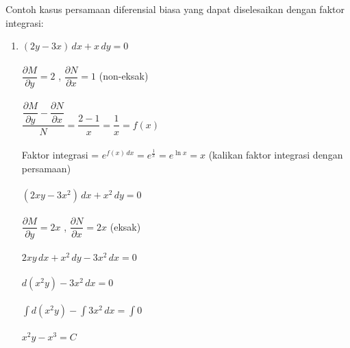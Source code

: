 Contoh kasus persamaan diferensial biasa yang dapat diselesaikan dengan faktor integrasi:

\begin{enumerate}[1.]

	\item \begin{math} (2y - 3x) \, dx + x \, dy = 0 \end{math} \\ \\ 
	\begin{math} \dfrac{\partial M}{\partial y} = 2 \end{math} , \begin{math} \dfrac{\partial N}{\partial x} = 1 \end{math} (non-eksak) \\ \\ 
	\begin{math} \dfrac{\dfrac{\partial M}{\partial y} - \dfrac{\partial N}{\partial x}}{N} = \dfrac{2 - 1}{x} = \dfrac{1}{x} = f(x) \end{math} \\ \\
	Faktor integrasi = \begin{math} e^{f(x) \, dx} = e^{\frac{1}{x}} = e ^{\ln x} = x \end{math} (kalikan faktor integrasi dengan persamaan) \\ \\ 
	\begin{math} (2xy - 3x^{2}) \, dx + x^{2} \, dy = 0 \end{math} \\ \\
	\begin{math} \dfrac{\partial M}{\partial y} = 2x \end{math} , \begin{math} \dfrac{\partial N}{\partial x} = 2x \end{math} (eksak) \\ \\ 
	\begin{math} 2xy \, dx + x^{2} \, dy - 3x^{2} \,dx = 0 \end{math} \\ \\
	\begin{math} d(x^{2}y) - 3x^{2} \, dx = 0 \end{math} \\ \\
	\begin{math} \int  d(x^{2}y) - \int 3x^{2} \, dx = \int 0 \end{math} \\ \\
	\begin{math} x^{2}y - x^{3} = C \end{math}


\end{enumerate}
